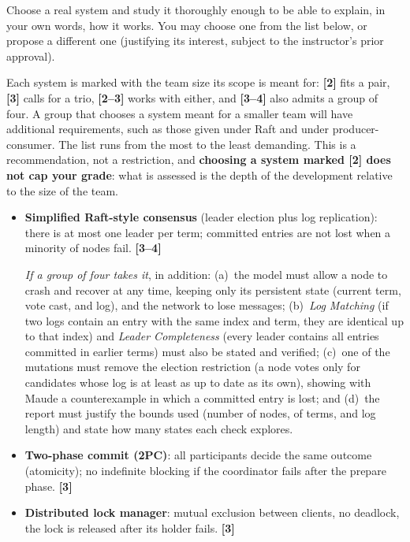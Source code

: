 \begin{listaejercicios}

\item\label{ej:eleccion}
Choose a real system and study it thoroughly enough to be able to explain,
in your own words, how it works. You may choose one from the list below, or
propose a different one (justifying its interest, subject to the
instructor's prior approval).

Each system is marked with the team size its scope is meant for:
\textbf{[2]} fits a pair, \textbf{[3]} calls for a trio,
\textbf{[2--3]} works with either, and \textbf{[3--4]} also admits a
group of four. A group that chooses a system meant for a smaller team will
have additional requirements, such as those given under Raft and under
producer-consumer. The list runs from the most to the least
demanding. This is a recommendation, not a restriction, and
\textbf{choosing a system marked \textbf{[2]} does not cap your grade}:
what is assessed is the depth of the development relative to the size of
the team.

\begin{itemize}
\item
\textbf{Simplified Raft-style consensus} (leader election plus log
replication): there is at most one leader per term; committed entries are
not lost when a minority of nodes fail. \textbf{[3--4]}

\emph{If a group of four takes it}, in addition:
(a)~the model must allow a node to crash and recover at any time, keeping
only its persistent state (current term, vote cast, and log), and the
network to lose messages;
(b)~\emph{Log Matching} (if two logs contain an entry with the same index
and term, they are identical up to that index) and \emph{Leader
Completeness} (every leader contains all entries committed in earlier
terms) must also be stated and verified;
(c)~one of the mutations must remove the election restriction (a node
votes only for candidates whose log is at least as up to date as its own),
showing with Maude a counterexample in which a committed entry is lost; and
(d)~the report must justify the bounds used (number of nodes, of terms, and
log length) and state how many states each check explores.

\item
\textbf{Two-phase commit (2PC)}: all participants decide the same outcome
(atomicity); no indefinite blocking if the coordinator fails after the
prepare phase. \textbf{[3]}

\item
\textbf{Distributed lock manager}: mutual exclusion between clients, no
deadlock, the lock is released after its holder fails. \textbf{[3]}


\end{itemize}
\end{listaejercicios}
